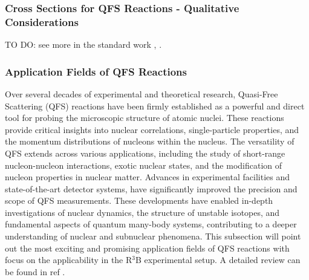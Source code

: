 \subsubsection{Cross Sections for QFS Reactions - Qualitative Considerations}
TO DO: see more in the standard work \cite{cladis1952nucleon}, \cite{MARIS19581}.
\subsubsection{Application Fields of QFS Reactions}
Over several decades of experimental and theoretical research, Quasi-Free Scattering (QFS) reactions have been firmly established as a powerful and direct tool for probing the microscopic structure of atomic nuclei. These reactions provide critical insights into nuclear correlations, single-particle properties, and the momentum distributions of nucleons within the nucleus.\newline
The versatility of QFS extends across various applications, including the study of short-range nucleon-nucleon interactions, exotic nuclear states, and the modification of nucleon properties in nuclear matter. Advances in experimental facilities and state-of-the-art detector systems, have significantly improved the precision and scope of QFS measurements. These developments have enabled in-depth investigations of nuclear dynamics, the structure of unstable isotopes, and fundamental aspects of quantum many-body systems, contributing to a deeper understanding of nuclear and subnuclear phenomena.\newline
This subsection will point out the most exciting and promising application fields of QFS reactions with focus on the applicability in the R$^3$B experimental setup. A detailed review can be found in ref \cite{panin2021quasi}.
